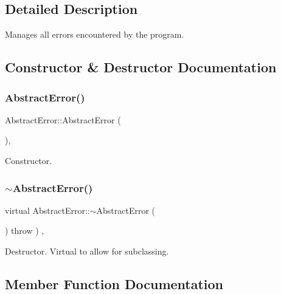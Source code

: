 \subsection{Detailed Description}
Manages all errors encountered by the program. 

\subsection{Constructor \& Destructor Documentation}
\mbox{\label{classAbstractError_ae40c5440712bdcf91b2b7d733e2ee80b}} 
\subsubsection{\texorpdfstring{Abstract\+Error()}{AbstractError()}}
{\footnotesize\ttfamily Abstract\+Error\+::\+Abstract\+Error (\begin{DoxyParamCaption}{ }\end{DoxyParamCaption})\hspace{0.3cm}{\ttfamily [inline]}, {\ttfamily [explicit]}}

Constructor. \mbox{\label{classAbstractError_a9b35711452ca3e32ac0609bcb493c181}} 
\subsubsection{\texorpdfstring{$\sim$\+Abstract\+Error()}{~AbstractError()}}
{\footnotesize\ttfamily virtual Abstract\+Error\+::$\sim$\+Abstract\+Error (\begin{DoxyParamCaption}{ }\end{DoxyParamCaption}) throw  ) \hspace{0.3cm}{\ttfamily [inline]}, {\ttfamily [virtual]}}

Destructor. Virtual to allow for subclassing. 

\subsection{Member Function Documentation}
\mbox{\label{classAbstractError_a19735c7a9b5f6e84db606292967667a9}} 
